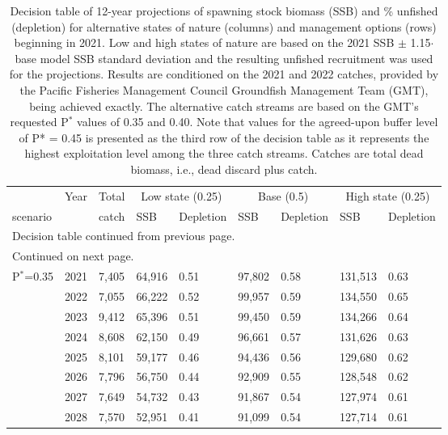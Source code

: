 \documentclass[11pt,
  english,
  a4paper,
]{article}
\begin{document}
\begingroup\fontsize{9}{11}\selectfont
\begingroup\fontsize{9}{11}\selectfont
{}
\begin{longtable}{lll|ll|ll|ll}
\caption{Decision table of 12-year projections of spawning stock biomass (SSB) and \% unfished (depletion) for alternative states of nature (columns) and management options (rows) beginning in 2021. Low and high states of nature are based on the 2021 SSB $\pm$ 1.15$\cdot$base model SSB standard deviation and the resulting unfished recruitment was used for the projections. Results are conditioned on the 2021 and 2022 catches, provided by the Pacific Fisheries Management Council Groundfish Management Team (GMT), being achieved exactly. The alternative catch streams are based on the GMT's requested P$^*$ values of 0.35 and 0.40. Note that values for the agreed-upon buffer level of P* = 0.45 is presented as the third row of the decision table as it represents the highest exploitation level among the three catch streams. Catches are total dead biomass, i.e., dead discard plus catch.} \\ 
  \hline
&Year&Total& \multicolumn{2}{c}{Low state (0.25)} & \multicolumn{2}{c}{Base (0.5)} & \multicolumn{2}{c}{High state (0.25)} \\
scenario & &catch& SSB & Depletion & SSB & Depletion & SSB & Depletion \\ 
\hline \endfirsthead
\multicolumn{9}{l}{\footnotesize Decision table continued from previous page.} \\
\hline \endhead
\hline
\multicolumn{9}{l}{\footnotesize Continued on next page.} \\
\endfoot
\endlastfoot
\hline
P$^*$=0.35
& 2021 & 7,405 & 64,916 & 0.51 & 97,802& 0.58 & 131,513 & 0.63 \\ 
&  2022 & 7,055 & 66,222 & 0.52 & 99,957 & 0.59 & 134,550 & 0.65 \\ 
&  2023 & 9,412 & 65,396 & 0.51 & 99,450 & 0.59 & 134,266 & 0.64 \\ 
&  2024 & 8,608 & 62,150 & 0.49 & 96,661 & 0.57 & 131,626 & 0.63 \\ 
&  2025 & 8,101 & 59,177 & 0.46 & 94,436 & 0.56 & 129,680 & 0.62 \\ 
&  2026 & 7,796 & 56,750 & 0.44 & 92,909 & 0.55 & 128,548 & 0.62 \\ 
&  2027 & 7,649 & 54,732 & 0.43 & 91,867 & 0.54 & 127,974 & 0.61 \\ 
&  2028 & 7,570 & 52,951 & 0.41 & 91,099 & 0.54 & 127,714 & 0.61 \\ 

\end{longtable}
\end{document}
